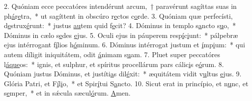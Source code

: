 2. Quóniam ecce peccatóres intendérunt arcum,~† paravérunt sagíttas suas in ph\uline{á}r\uline{e}tra,~* ut sagíttent in obscúro r\uline{e}ctos c\uline{o}rde.
3. Quóniam quæ perfecísti, d\uline{e}strux\uline{é}runt:~* justus \uline{au}tem quid f\uline{e}cit?
4. Dóminus in templo s\uline{a}ncto s\uline{u}o,~* Dóminus in cælo s\uline{e}des \uline{e}jus.
5. Oculi ejus in páuperem resp\uline{í}c\uline{i}unt:~* pálpebræ ejus intérrogant f\uline{í}lios h\uline{ó}minum.
6. Dóminus intérrogat justum et \uline{í}mp\uline{i}um:~* qui autem díligit iniquitátem, odit \uline{á}nimam s\uline{u}am.
7. Pluet super peccatóres l\uline{á}\uline{que}os:~* ignis, et sulphur, et spíritus procellárum pars cálic\uline{i}s e\uline{ó}rum.
8. Quóniam justus Dóminus, et justíti\uline{a}s dil\uline{é}xit:~* æquitátem vidit v\uline{u}ltus \uline{e}jus.
9. Glória Patri, et F\uline{í}l\uline{i}o,~* et Spir\uline{í}tui S\uline{a}ncto.
10. Sicut erat in princípio, et n\uline{u}nc, et s\uline{e}mper,~* et in sǽcula sæcul\uline{ó}rum. \uline{A}men.
